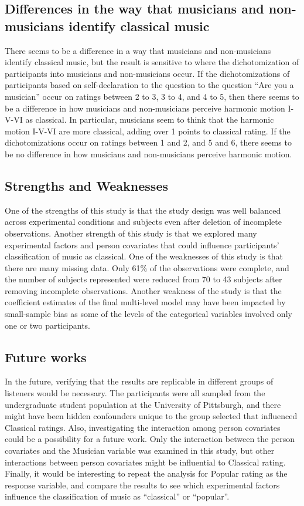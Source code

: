 \documentclass{article}
\begin{document}
\subsection{Differences in the way that musicians and non-musicians identify classical music}

There seems to be a difference in a way that musicians and non-musicians identify classical music, but the result is sensitive to where the dichotomization of participants into musicians and non-musicians occur. If the dichotomizations of participants based on self-declaration to the question to the question ``Are you a musician'' occur on ratings between 2 to 3, 3 to 4, and 4 to 5, then there seems to be a difference in how musicians and non-musicians perceive harmonic motion I-V-VI as classical. In particular, musicians seem to think that the harmonic motion I-V-VI are more classical, adding over 1 points to classical rating. If the dichotomizations occur on ratings between 1 and 2, and 5 and 6, there seems to be no difference in how musicians and non-musicians perceive harmonic motion.

\subsection{Strengths and Weaknesses}
One of the strengths of this study is that the study design was well balanced across experimental conditions and subjects even after deletion of incomplete observations. Another strength of this study is that we explored many experimental factors and person covariates that could influence participants' classification of music as classical. One of the weaknesses of this study is that there are many missing data. Only 61\% of the observations were complete, and the number of subjects represented were reduced from 70 to 43 subjects after removing incomplete observations. Another weakness of the study is that the coefficient estimates of the final multi-level model may have been impacted by small-sample bias as some of the levels of the categorical variables involved only one or two participants.

\subsection{Future works}
In the future, verifying that the results are replicable in different groups of listeners would be necessary. The participants were all sampled from the undergraduate student population at the University of Pittsburgh, and there might have been hidden confounders unique to the group selected that influenced Classical ratings. Also, investigating the interaction among person covariates could be a possibility for a future work. Only the interaction between the person covariates and the Musician variable was examined in this study, but other interactions between person covariates might be influential to Classical rating. Finally, it would be interesting to repeat the analysis for Popular rating as the response variable, and compare the results to see which experimental factors influence the classification of music as ``classical'' or ``popular''.
\end{document}
